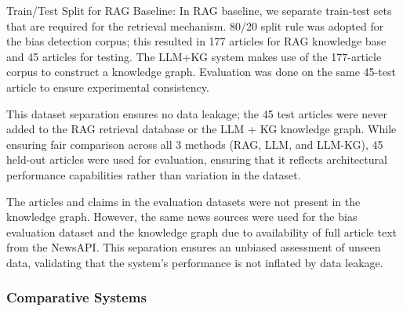 \documentclass[11pt]{article}
\begin{document}
Train/Test Split for RAG Baseline:
In RAG baseline, we separate train-test sets that are required for the retrieval mechanism. 80/20 split rule was adopted for the bias detection corpus; this resulted in 177 articles for RAG knowledge base and 45 articles for testing.  The LLM+KG system makes use of the 177-article corpus to construct a knowledge graph. Evaluation was done on the same 45-test article to ensure experimental consistency. 

This dataset separation ensures no data leakage; the 45 test articles were never added to the RAG retrieval database or the LLM + KG knowledge graph. While ensuring fair comparison across all 3 methods (RAG, LLM, and LLM-KG), 45 held-out articles were used for evaluation, ensuring that it reflects architectural performance capabilities rather than variation in the dataset.


The articles and claims in the evaluation datasets were not present in the knowledge graph. However, the same news sources were used for the bias evaluation dataset and the knowledge graph due to availability of full article text from the NewsAPI. This separation ensures an unbiased assessment of unseen data, validating that the system’s performance is not inflated by data leakage.

\subsubsection{Comparative Systems}
\end{document}
